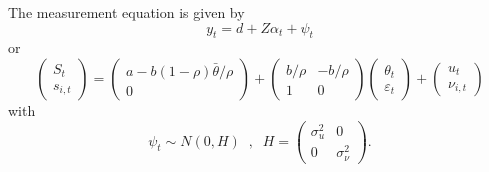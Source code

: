 \documentclass[a4,12pt]{article}
\begin{document}
The measurement equation is given by
\begin{equation}
y_t = d + Z \alpha_t + \psi_t
\end{equation}
or
\begin{equation*}
\left(
\begin{array}{c}
S_t\\
s_{i,t}
\end{array}
\right)
=
\left(
\begin{array}{c}
a - b(1-\rho) \bar{\theta}/\rho\\
0
\end{array}
\right)
+
\left(
\begin{array}{cc}
b/\rho & -b/\rho\\
1 & 0
\end{array}
\right)
\left(
\begin{array}{c}
\theta_{t}\\
\varepsilon_{t}
\end{array}
\right)
+
\left(
\begin{array}{c}
u_t\\
\nu_{i,t}
\end{array}
\right)
\end{equation*}
with
\begin{equation*}
\psi_t \sim N(0, H) \; \; , \; \;
H =
\left(
\begin{array}{cc}
\sigma_{u}^2 & 0\\
0 & \sigma_\nu^2
\end{array}
\right).
\end{equation*}
\end{document}
